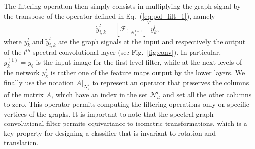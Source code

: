 \documentclass[10pt,journal,compsoc]{IEEEtran}
\begin{document}
	The filtering operation then simply consists in multiplying the graph signal by the transpose of the operator defined in Eq.~(\ref{eq:pol_filt_1}), namely 
	\begin{equation}
	\tilde{y}_{i,k}^{l} =\left[\mathcal{F}_i^{l}|_{\mathcal{N}_i^{l-1}}\right]^T y_k^{l} , 
	\label{eq:pol_filt_2}
	\end{equation}
	\noindent
	where $y_k^{l}$ and $\tilde{y}_{i,k}^{l}$ are the graph signals at the input and respectively the output of the $l^{th}$ spectral convolutional layer (see Fig.~\ref{fig:conv}). In particular, $y_k^{(1)} = y_0$ is the input image for the first level filter, while at the next levels of the network $y_k^{l}$ is rather one of the feature maps output by the lower layers. We finally use the notation $A |_{\mathcal{N}_i^{l}}$ to represent an operator that preserves the columns of the matrix $A$, which have an index in the set ${\mathcal{N}_i^{l}}$, and set all the other columns to zero. This operator permits computing the filtering operations only on specific vertices of the graphs. It is important to note that the spectral graph convolutional filter permits equivariance to isometric transformations, which is a key property for designing a classifier that is invariant to rotation and translation. 
	
\end{document}
